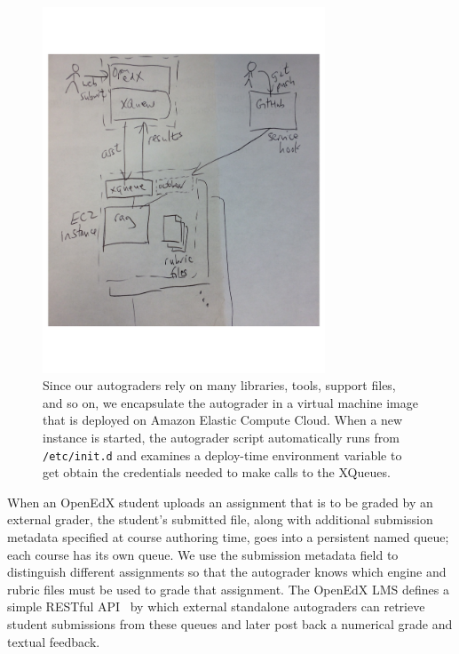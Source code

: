 \begin{figure}
  \centering
  \includegraphics[width=0.75\textwidth]{figs/autograder_arch.pdf}
  \caption{\label{fig:arch}
  Since our autograders rely on many libraries,
  tools, support files, and so on, we encapsulate the autograder in a
  virtual machine image that is deployed on Amazon Elastic Compute Cloud.
  When a new instance is started, the autograder script automatically runs from
  \texttt{/etc/init.d} and examines a deploy-time environment variable
  to get obtain the credentials needed to make calls to the XQueues.}
\end{figure}

When an OpenEdX student uploads an assignment that is to be graded by an
external grader, the student's submitted file, along with additional
submission metadata specified at course authoring time, goes into a
persistent named queue; each course has its own queue.
We use the submission metadata field to distinguish different
assignments so that the autograder knows which engine and rubric files
must be used to grade that assignment.
The OpenEdX LMS defines a simple RESTful
API~
by which external standalone autograders can retrieve student
submissions from these queues and later post back a numerical grade and
textual feedback.

